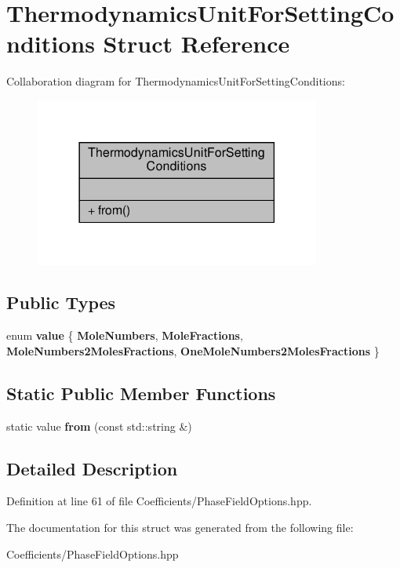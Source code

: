 \hypertarget{structThermodynamicsUnitForSettingConditions}{}\section{Thermodynamics\+Unit\+For\+Setting\+Conditions Struct Reference}
\label{structThermodynamicsUnitForSettingConditions}


Collaboration diagram for Thermodynamics\+Unit\+For\+Setting\+Conditions\+:\nopagebreak
\begin{figure}[H]
\begin{center}
\leavevmode
\includegraphics[width=266pt]{structThermodynamicsUnitForSettingConditions__coll__graph}
\end{center}
\end{figure}
\subsection*{Public Types}
\begin{DoxyCompactItemize}
\item 
\mbox{\label{structThermodynamicsUnitForSettingConditions_af16a74b352a63431c7dfca14fb12e38a}} 
enum {\bfseries value} \{ {\bfseries Mole\+Numbers}, 
{\bfseries Mole\+Fractions}, 
{\bfseries Mole\+Numbers2\+Moles\+Fractions}, 
{\bfseries One\+Mole\+Numbers2\+Moles\+Fractions}
 \}
\end{DoxyCompactItemize}
\subsection*{Static Public Member Functions}
\begin{DoxyCompactItemize}
\item 
\mbox{\label{structThermodynamicsUnitForSettingConditions_a14ef73d58bbeac4e388e5e07e9d1dfdc}} 
static value {\bfseries from} (const std\+::string \&)
\end{DoxyCompactItemize}


\subsection{Detailed Description}


Definition at line 61 of file Coefficients/\+Phase\+Field\+Options.\+hpp.



The documentation for this struct was generated from the following file\+:\begin{DoxyCompactItemize}
\item 
Coefficients/\+Phase\+Field\+Options.\+hpp\end{DoxyCompactItemize}
